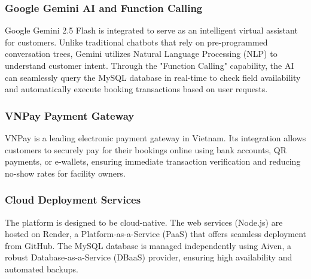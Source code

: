 \subsubsection{Google Gemini AI and Function Calling}
Google Gemini 2.5 Flash is integrated to serve as an intelligent virtual assistant for customers. Unlike traditional chatbots that rely on pre-programmed conversation trees, Gemini utilizes Natural Language Processing (NLP) to understand customer intent. Through the "Function Calling" capability, the AI can seamlessly query the MySQL database in real-time to check field availability and automatically execute booking transactions based on user requests.

\subsubsection{VNPay Payment Gateway}
VNPay is a leading electronic payment gateway in Vietnam. Its integration allows customers to securely pay for their bookings online using bank accounts, QR payments, or e-wallets, ensuring immediate transaction verification and reducing no-show rates for facility owners.

\subsubsection{Cloud Deployment Services}
The platform is designed to be cloud-native. The web services (Node.js) are hosted on Render, a Platform-as-a-Service (PaaS) that offers seamless deployment from GitHub. The MySQL database is managed independently using Aiven, a robust Database-as-a-Service (DBaaS) provider, ensuring high availability and automated backups.